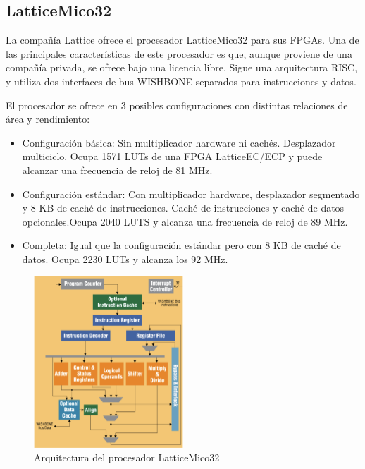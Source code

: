 	\subsection{LatticeMico32}
 
La compañía Lattice ofrece el procesador LatticeMico32 para sus FPGAs. Una de las principales características de este procesador es que, aunque proviene de una compañía privada, se ofrece bajo una licencia libre. Sigue una arquitectura RISC, y utiliza dos interfaces de bus WISHBONE \cite{Etiqueta34}separados para instrucciones y datos.

 El procesador se ofrece en 3 posibles configuraciones con distintas relaciones de área y rendimiento:

\begin{itemize}
		  \item Configuración básica: Sin multiplicador hardware ni cachés. Desplazador multiciclo. Ocupa 1571 LUTs de una FPGA LatticeEC/ECP y puede alcanzar una frecuencia de reloj de 81 MHz.
		 \item Configuración estándar: Con multiplicador hardware, desplazador segmentado y 8 KB de caché de instrucciones. Caché de instrucciones y caché de datos opcionales.Ocupa 2040 LUTS y alcanza una frecuencia de reloj de 89 MHz.
 		\item Completa: Igual que la configuración estándar pero con 8 KB de caché de datos. Ocupa 2230 LUTs y alcanza los 92 MHz.
		\end{itemize}

\begin{figure}[h!]
 	\begin{center}
  	\includegraphics[width=0.5\textwidth,keepaspectratio=true]{./images/latice}
  	\caption{Arquitectura del procesador LatticeMico32}
 	\end{center}
	\end{figure}

